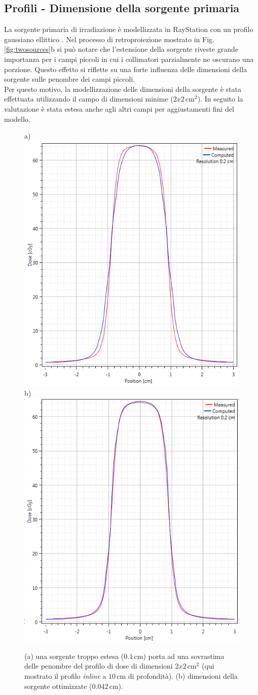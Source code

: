 \subsection{Profili - Dimensione della sorgente primaria}
La sorgente primaria di irradiazione è modellizzata in RayStation con un profilo gaussiano ellittico \cite{Chaney1994}. Nel processo di retroproiezione mostrato in Fig.\ref{fig:twosources}b si può notare che l'estensione della sorgente riveste grande importanza per i campi piccoli in cui i collimatori parzialmente ne oscurano una porzione. Questo effetto si riflette su una forte influenza delle dimensioni della sorgente sulle penombre dei campi piccoli.\\
Per questo motivo, la modellizzazione delle dimensioni della sorgente è stata effettuata utilizzando il campo di dimensioni minime ($2x2\,$cm$^2$). In seguito la valutazione è stata estesa anche agli altri campi per aggiustamenti fini del modello.
\begin{figure}
\centering
a)\includegraphics[width=.43\textwidth]{./cap2/Ray_penumbra_wrong.PNG}
b)\includegraphics[width=.43\textwidth]{./cap2/Ray_penumbra_right.PNG}
\caption{(a) una sorgente troppo estesa ($0.1\,$cm) porta ad una sovrastima delle penombre del profilo di dose di dimensioni $2x2\,$cm$^2$ (qui mostrato il profilo \textit{inline} a $10\,$cm di profondità). (b) dimensioni della sorgente ottimizzate ($0.042\,$cm).}
\label{fig:source_2x2}
\end{figure}



